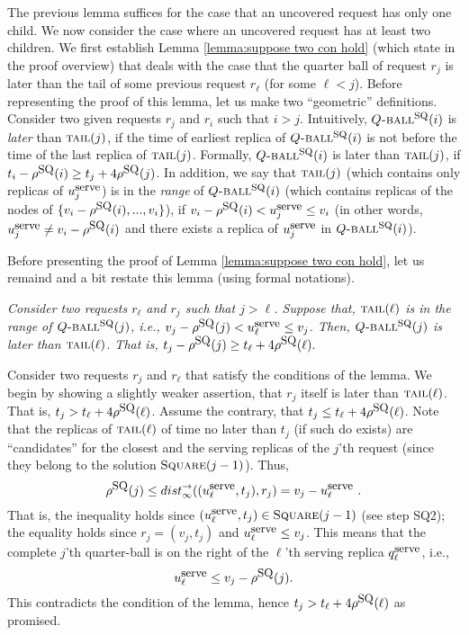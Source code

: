 \documentclass[11pt]{article}
\newcommand{\Square}[0]{\mbox{\sc Square}}
\newcommand{\rr}{r}
\newcommand{\distinf}[1]{{dist}^{\rightarrow}_{\infty}(#1)}
\newcommand{\qSQ}{q^{\mbox{\small\upshape serve}}}
\newcommand{\uSQ}{u^{\mbox{\small\upshape serve}}}
\newcommand{\tail}[0]{\mbox{\sc tail}}
\newcommand{\rhoSQ}[0]{\rho^{\mbox{\small\upshape SQ}}}
\newcommand{\SQball}[0]{Q{\mbox{\sc -ball}}^{\mbox{\sc sq}}}
\begin{document}
The previous lemma suffices for the case that an uncovered request has only one child.
We now consider the case where an uncovered request has at least two children.
We first establish Lemma \ref{lemma:suppose two con hold} (which state in the proof overview)
that deals with the case that the quarter ball of request $r_j$ is later than the tail of some previous request $r_\ell$ (for some $\ell<j$).
Before representing the proof of this lemma, let us make two ``geometric'' definitions.
Consider two given requests $\rr_j$ and $\rr_i$ such that $i>j$.
Intuitively, $\SQball(i)$ is {\em later} than $\tail(j)$, if the time of earliest replica of $\SQball(i)$ is not before the time of the last replica of $\tail(j)$.
Formally, $\SQball(i)$ is later than $\tail(j)$, if $t_i-\rhoSQ(i)\geq t_j+4\rhoSQ(j)$.
In addition, we say that $\tail(j)$ (which contains only replicas of $\uSQ_j$) is in the {\em range} of $\SQball(i)$
(which contains replicas of the nodes of $\{v_i-\rhoSQ(i),...,v_i\}$),
if $v_i-\rhoSQ(i)< \uSQ_j\leq v_i$
(in other words, $\uSQ_j\not= v_i-\rhoSQ(i)$ and there exists a replica of $\uSQ_j$ in $\SQball(i)$).









\newpage

Before presenting the proof of Lemma \ref{lemma:suppose two con hold}, let us remaind and a bit restate this lemma (using formal notations).



{\em
Consider two requests $\rr_\ell$ and $\rr_j$ such that $j>\ell$.
Suppose that,
$\tail(\ell)$ is in the range of $\SQball(j)$, i.e., $v_j-\rhoSQ(j)<\uSQ_\ell\leq v_j$.
Then, $\SQball(j)$ is later than $\tail(\ell)$. That is,
$t_j-\rhoSQ(j) \geq t_\ell+4\rhoSQ(\ell).$
}



Consider two requests $\rr_j$ and $\rr_\ell$ that satisfy the conditions of the lemma.
We begin by showing a slightly weaker assertion, that $r_j$ itself is later than $\tail(\ell)$.
That is, $t_j>t_\ell+4\rhoSQ(\ell)$.
Assume the contrary, that $t_j \leq t_\ell+4\rhoSQ(\ell)$.
Note that
the replicas of $\tail(\ell)$ of time no later than $t_j$ (if such do exists)
are ``candidates'' for the closest and the serving replicas of the $j$'th request
(since they belong to the solution $\Square(j-1)$).
Thus,
$$
\rhoSQ(j)\leq \distinf{(\uSQ_\ell,t_j), r_j}= v_j-\uSQ_\ell~.
$$
That is, the inequality holds since $(\uSQ_\ell,t_j)\in\Square(j-1)$ (see step SQ2);
the equality holds since $r_j=(v_j,t_j)$ and $\uSQ_\ell \leq v_j$.
This means that the complete $j$'th quarter-ball is on the right of the $\ell$'th serving replica $\qSQ_\ell$, i.e.,
$$\uSQ_\ell \leq v_j - \rhoSQ(j).$$
This contradicts the condition of the lemma, hence $t_j>t_\ell+4\rhoSQ(\ell)$ as promised.
\end{document}
